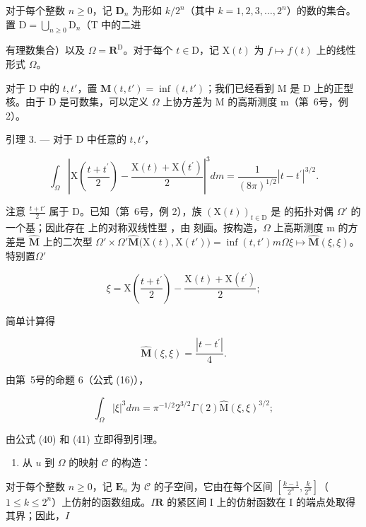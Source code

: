 对于每个整数 \(n \geqslant 0\)，记 \(\mathbf{D}_n\) 为形如 \(k / 2^n\)（其中 \(k = 1, 2, 3, \ldots, 2^n\)）的数的集合。置 \(\mathrm{D} = \bigcup_{n \geqslant 0} \mathrm{D}_n\)（T 中的二进

有理数集合）以及 \(\Omega = \mathbf{R}^{\mathrm{D}}\)。对于每个 \(t \in \mathrm{D}\)，记 \(\mathrm{X}(t)\) 为 \(f \mapsto f(t)\) 上的线性形式 \(\Omega\)。

对于 D 中的 \(t, t'\)，置 \(\mathbf{M}(t, t') = \inf(t, t')\)；我们已经看到 M 是 D 上的正型核。由于 D 是可数集，可以定义 \(\Omega\) 上协方差为 M 的高斯测度 m（第~6号，例 2）。

引理 3. --- 对于 D 中任意的 \(t, t'\)，

\[
\int_ {\Omega} \left| \mathrm{X} \left(\frac {t + t ^ {\prime}}{2}\right) - \frac {\mathrm{X} (t) + \mathrm{X} \left(t ^ {\prime}\right)}{2} \right| ^ {3} d m = \frac {1}{(8 \pi) ^ {1 / 2}} | t - t ^ {\prime} | ^ {3 / 2}.\tag{38}
\]

注意 \(\frac{t + t'}{2}\) 属于 D。已知（第~6号，例 2），族 \(\left(\mathrm{X}(t)\right)_{t\in \mathrm{D}}\) 是  的拓扑对偶 \(\Omega'\) 的一个基；因此存在  上的对称双线性型 ，由  刻画。按构造，\(\Omega\) 上高斯测度 m 的方差是 \(\widehat{\mathbf{M}}\) 上的二次型 \(\Omega' \times \Omega'\)\(\widehat{\mathbf{M}}\big(\mathrm{X}(t),\mathrm{X}(t')\big) = \inf(t,t')\)\(m\)\(\Omega\)\(\xi \mapsto \widehat{\mathbf{M}}(\xi ,\xi)\)。特别置\(\Omega'\)

\[
\xi = \mathrm{X} \left(\frac {t + t ^ {\prime}}{2}\right) - \frac {\mathrm{X} (t) + \mathrm{X} (t ^ {\prime})}{2};\tag{39}
\]

简单计算得

\[
\widehat {\mathbf {M}} (\xi , \xi) = \frac {| t - t ^ {\prime} |}{4}.\tag{40}
\]

由第~5号的命题 6（公式 (16)），

\[
\int_ {\Omega} | \xi | ^ {3} d m = \pi^ {- 1 / 2} 2 ^ {3 / 2} \Gamma (2) \widehat {\mathrm{M}} (\xi , \xi) ^ {3 / 2};\tag{41}
\]

由公式 (40) 和 (41) 立即得到引理。

\begin{enumerate}
\def\labelenumi{\Alph{enumi})}
\setcounter{enumi}{1}
\tightlist
\item
  从 \(u\) 到 \(\Omega\) 的映射 \(\mathcal{C}\) 的构造：
\end{enumerate}

对于每个整数 \(n \geqslant 0\)，记 \(\mathbf{E}_n\) 为 \(\mathcal{C}\) 的子空间，它由在每个区间 \(\left[\frac{k - 1}{2^n}, \frac{k}{2^n}\right]\)（\(1 \leqslant k \leqslant 2^n\)）上仿射的函数组成。\(I\)\(\mathbf{R}\) 的紧区间 I 上的仿射函数在 I 的端点处取得其界；因此，\(I\)

